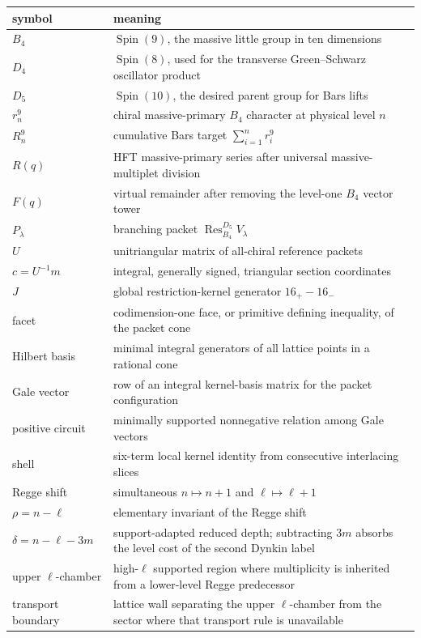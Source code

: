 \documentclass[11pt,a4paper]{article}
\theoremstyle{definition}
\newcommand{\Spin}{\operatorname{Spin}}
\newcommand{\Res}{\operatorname{Res}}
\begin{document}
\begin{longtable}{p{}p{}}
\toprule
symbol & meaning \\
\midrule
$B_4$ & $\Spin(9)$, the massive little group in ten dimensions \\
$D_4$ & $\Spin(8)$, used for the transverse Green--Schwarz oscillator product \\
$D_5$ & $\Spin(10)$, the desired parent group for Bars lifts \\
$r_n^9$ & chiral massive-primary $B_4$ character at physical level $n$ \\
$R_n^9$ & cumulative Bars target $\sum_{i=1}^{n}r_i^9$ \\
$R(q)$ & HFT massive-primary series after universal massive-multiplet division \\
$F(q)$ & virtual remainder after removing the level-one $B_4$ vector tower \\
$P_\lambda$ & branching packet $\Res^{D_5}_{B_4}V_\lambda$ \\
$U$ & unitriangular matrix of all-chiral reference packets \\
$c=U^{-1}m$ & integral, generally signed, triangular section coordinates \\
$J$ & global restriction-kernel generator $16_+-16_-$ \\
facet & codimension-one face, or primitive defining inequality, of the packet cone \\
Hilbert basis & minimal integral generators of all lattice points in a rational cone \\
Gale vector & row of an integral kernel-basis matrix for the packet configuration \\
positive circuit & minimally supported nonnegative relation among Gale vectors \\
shell & six-term local kernel identity from consecutive interlacing slices \\
Regge shift & simultaneous $n\mapsto n+1$ and $\ell\mapsto\ell+1$ \\
$\rho=n-\ell$ & elementary invariant of the Regge shift \\
$\delta=n-\ell-3m$ & support-adapted reduced depth; subtracting $3m$ absorbs the level cost of the second Dynkin label \\
upper $\ell$-chamber & high-$\ell$ supported region where multiplicity is inherited from a lower-level Regge predecessor \\
transport boundary & lattice wall separating the upper $\ell$-chamber from the sector where that transport rule is unavailable \\

\end{longtable}
\end{document}
